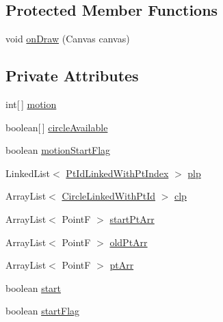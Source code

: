 \subsection*{Protected Member Functions}
\begin{DoxyCompactItemize}
\item 
void \hyperlink{classcom_1_1example_1_1multitouchsample_1_1_main_activity_1_1_my_view_a26704cac8a42993a73637404da71988e}{on\+Draw} (Canvas canvas)
\end{DoxyCompactItemize}
\subsection*{Private Attributes}
\begin{DoxyCompactItemize}
\item 
int\mbox{[}$\,$\mbox{]} \hyperlink{classcom_1_1example_1_1multitouchsample_1_1_main_activity_1_1_my_view_a3e8186596771c2fae1397b496be41230}{motion}
\item 
boolean\mbox{[}$\,$\mbox{]} \hyperlink{classcom_1_1example_1_1multitouchsample_1_1_main_activity_1_1_my_view_a5df7070a08705a7a8d8aa00a906fa767}{circle\+Available}
\item 
boolean \hyperlink{classcom_1_1example_1_1multitouchsample_1_1_main_activity_1_1_my_view_ab1da26ed65817fe5db4d0be4892ac4b2}{motion\+Start\+Flag}
\item 
Linked\+List$<$ \hyperlink{classcom_1_1example_1_1multitouchsample_1_1_main_activity_1_1_my_view_1_1_pt_id_linked_with_pt_index}{Pt\+Id\+Linked\+With\+Pt\+Index} $>$ \hyperlink{classcom_1_1example_1_1multitouchsample_1_1_main_activity_1_1_my_view_a594a2fb9e001c0cfa1aa538c903bc3f8}{plp}
\item 
Array\+List$<$ \hyperlink{classcom_1_1example_1_1multitouchsample_1_1_main_activity_1_1_my_view_1_1_circle_linked_with_pt_id}{Circle\+Linked\+With\+Pt\+Id} $>$ \hyperlink{classcom_1_1example_1_1multitouchsample_1_1_main_activity_1_1_my_view_a3bbc2d3fe569814080fe27c6c64eca77}{clp}
\item 
Array\+List$<$ Point\+F $>$ \hyperlink{classcom_1_1example_1_1multitouchsample_1_1_main_activity_1_1_my_view_a8e580a64440ed09158aa2bbc50ad4cf6}{start\+Pt\+Arr}
\item 
Array\+List$<$ Point\+F $>$ \hyperlink{classcom_1_1example_1_1multitouchsample_1_1_main_activity_1_1_my_view_abf78b5272ae2cffeed639bd024d2a642}{old\+Pt\+Arr}
\item 
Array\+List$<$ Point\+F $>$ \hyperlink{classcom_1_1example_1_1multitouchsample_1_1_main_activity_1_1_my_view_ab2213518b7234955478ef54ebdd1db22}{pt\+Arr}
\item 
boolean \hyperlink{classcom_1_1example_1_1multitouchsample_1_1_main_activity_1_1_my_view_a45f874e10d05217f17e21ebee2f636ea}{start}
\item 
boolean \hyperlink{classcom_1_1example_1_1multitouchsample_1_1_main_activity_1_1_my_view_a10816f1798f68acf937c930b526b112d}{start\+Flag}
\end{DoxyCompactItemize}
